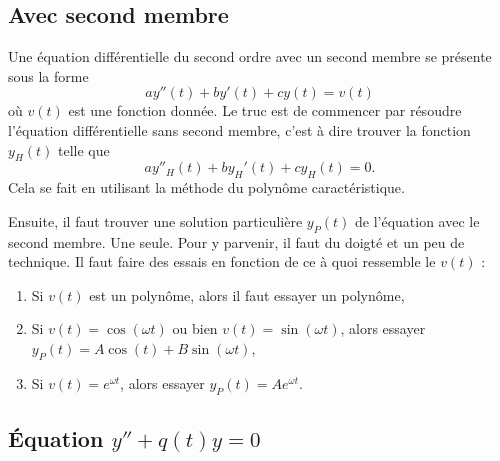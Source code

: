 \subsection{Avec second membre}

Une équation différentielle du second ordre avec un second membre se présente sous la forme
\begin{equation}
	ay''(t)+by'(t)+cy(t)=v(t)
\end{equation}
où $v(t)$ est une fonction donnée. Le truc est de commencer par résoudre l'équation différentielle sans second membre, c'est à dire trouver la fonction $y_H(t)$ telle que
\begin{equation}
	ay''_H(t)+by_H'(t)+cy_H(t)=0.
\end{equation}
Cela se fait en utilisant la méthode du polynôme caractéristique.

Ensuite, il faut trouver une solution particulière $y_P(t)$ de l'équation avec le second membre. Une seule. Pour y parvenir, il faut du doigté et un peu de technique. Il faut faire des essais en fonction de ce à quoi ressemble le $v(t)$ :
\begin{enumerate}

	\item
		Si $v(t)$ est un polynôme, alors il faut essayer un polynôme,

	\item
		Si $v(t)=\cos(\omega t)$ ou bien $v(t)=\sin(\omega t)$, alors essayer $y_P(t)=A\cos(t)+B\sin(\omega t)$,

	\item
		Si $v(t)= e^{\omega t}$, alors essayer $y_P(t)=A e^{\omega t}$.

\end{enumerate}

\subsection{Équation \texorpdfstring{$y''+q(t)y=0$}{y''+q(t)y=0}}
\label{subsecSyTwyM}



